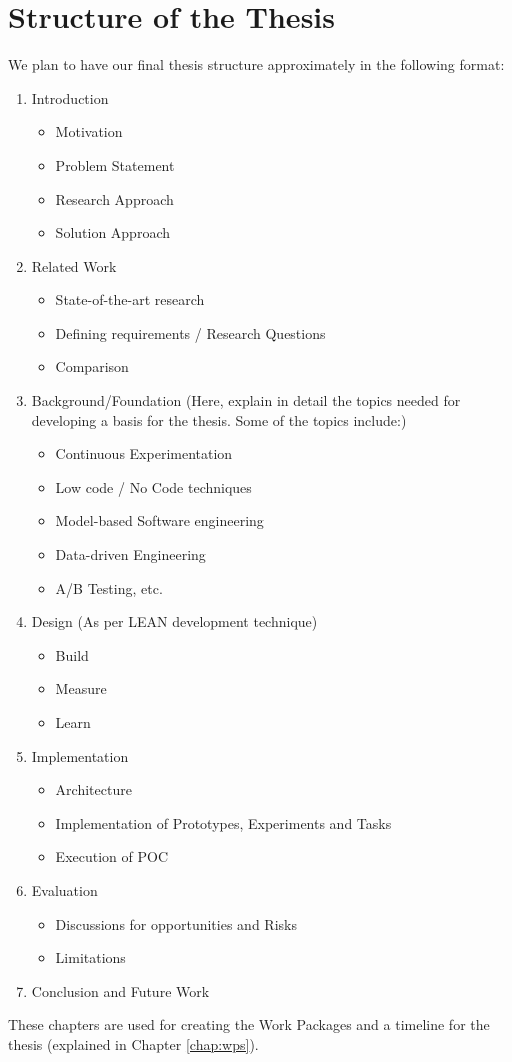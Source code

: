 \chapter{Structure of the Thesis} \label{sec:structure}

We plan to have our final thesis structure approximately in the following format: 

\begin{enumerate}
	\item Introduction
	\begin{itemize}
		\item Motivation
		\item Problem Statement
		\item Research Approach
		\item Solution Approach
	\end{itemize}
	\item Related Work
	\begin{itemize}
		\item State-of-the-art research
		\item Defining requirements / Research Questions
		\item Comparison
	\end{itemize}
	\item Background/Foundation (Here, explain in detail the topics needed for developing a basis for the thesis. Some of the topics include:)
	\begin{itemize}
		\item Continuous Experimentation
		\item Low code / No Code techniques
		\item Model-based Software engineering
		\item Data-driven Engineering
		\item A/B Testing, etc. 
	\end{itemize}
	\item Design (As per LEAN development technique)
	\begin{itemize}
		\item Build
		\item Measure
		\item Learn
	\end{itemize}
	\item Implementation
	\begin{itemize}
		\item Architecture
		\item Implementation of Prototypes, Experiments and Tasks
		\item Execution of POC
	\end{itemize}
	\item Evaluation
	\begin{itemize}
		\item Discussions for opportunities and Risks
		\item Limitations
	\end{itemize}
	\item Conclusion and Future Work
\end{enumerate}

These chapters are used for creating the Work Packages and a timeline for the thesis (explained in Chapter \ref{chap:wps}).